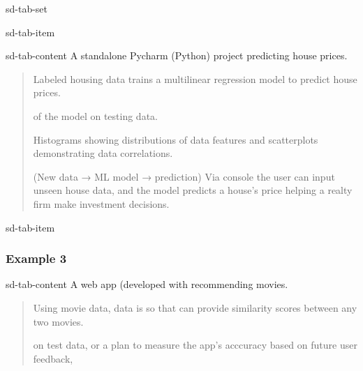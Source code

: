 \documentclass[letterpaper,10pt,english]{jupyterBook}
\begin{document}
\begin{sphinxuseclass}{sd-tab-set}
\begin{sphinxuseclass}{sd-tab-item}
\begin{sphinxuseclass}{sd-tab-content}
\sphinxAtStartPar
{} A standalone Pycharm (Python) project predicting house prices.
\begin{quote}

\sphinxAtStartPar
{} Labeled housing data trains a multi\sphinxhyphen{}linear regression model to predict house prices.

\sphinxAtStartPar
{}  of the model on testing data.

\sphinxAtStartPar
{} Histograms showing distributions of data features and scatterplots demonstrating data correlations.

\sphinxAtStartPar
{} (New data → ML model → prediction) Via console the user can input unseen house data, and the model predicts a house’s price helping a realty firm make investment decisions.
\end{quote}

\end{sphinxuseclass}
\end{sphinxuseclass}
\begin{sphinxuseclass}{sd-tab-item}\subsubsection*{Example 3}

\begin{sphinxuseclass}{sd-tab-content}
\sphinxAtStartPar
{} A web app (developed with  recommending movies.
\begin{quote}

\sphinxAtStartPar
{} Using movie data, data is  so that  can provide similarity scores between any two movies.

\sphinxAtStartPar
{}  on test data, or a plan to measure the app’s acccuracy based on future user feedback,


\end{quote}
\end{sphinxuseclass}
\end{sphinxuseclass}
\end{sphinxuseclass}
\end{document}
